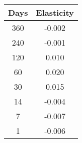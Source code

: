\begin{tabular}{||c c||}
\hline
Days & Elasticity \\
\hline\hline
360 & -0.002 \\
240 & -0.001 \\
120 & 0.010 \\
60 & 0.020 \\
30 & 0.015 \\
14 & -0.004 \\
7 & -0.007 \\
1 & -0.006 \\
\hline
\end{tabular}
